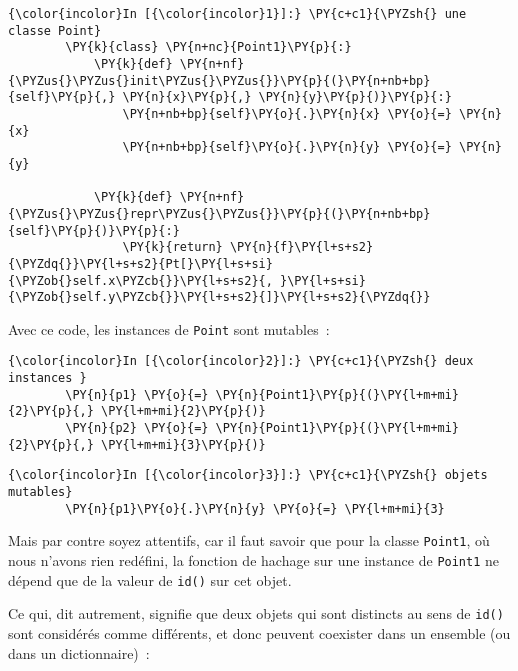    \begin{Verbatim}[commandchars=\\\{\},frame=single,framerule=0.3mm,rulecolor=\color{cellframecolor}]
{\color{incolor}In [{\color{incolor}1}]:} \PY{c+c1}{\PYZsh{} une classe Point}
        \PY{k}{class} \PY{n+nc}{Point1}\PY{p}{:}
            \PY{k}{def} \PY{n+nf}{\PYZus{}\PYZus{}init\PYZus{}\PYZus{}}\PY{p}{(}\PY{n+nb+bp}{self}\PY{p}{,} \PY{n}{x}\PY{p}{,} \PY{n}{y}\PY{p}{)}\PY{p}{:}
                \PY{n+nb+bp}{self}\PY{o}{.}\PY{n}{x} \PY{o}{=} \PY{n}{x}
                \PY{n+nb+bp}{self}\PY{o}{.}\PY{n}{y} \PY{o}{=} \PY{n}{y}
                
            \PY{k}{def} \PY{n+nf}{\PYZus{}\PYZus{}repr\PYZus{}\PYZus{}}\PY{p}{(}\PY{n+nb+bp}{self}\PY{p}{)}\PY{p}{:}
                \PY{k}{return} \PY{n}{f}\PY{l+s+s2}{\PYZdq{}}\PY{l+s+s2}{Pt[}\PY{l+s+si}{\PYZob{}self.x\PYZcb{}}\PY{l+s+s2}{, }\PY{l+s+si}{\PYZob{}self.y\PYZcb{}}\PY{l+s+s2}{]}\PY{l+s+s2}{\PYZdq{}}
\end{Verbatim}


    Avec ce code, les instances de \texttt{Point} sont mutables~:

    \begin{Verbatim}[commandchars=\\\{\},frame=single,framerule=0.3mm,rulecolor=\color{cellframecolor}]
{\color{incolor}In [{\color{incolor}2}]:} \PY{c+c1}{\PYZsh{} deux instances }
        \PY{n}{p1} \PY{o}{=} \PY{n}{Point1}\PY{p}{(}\PY{l+m+mi}{2}\PY{p}{,} \PY{l+m+mi}{2}\PY{p}{)}
        \PY{n}{p2} \PY{o}{=} \PY{n}{Point1}\PY{p}{(}\PY{l+m+mi}{2}\PY{p}{,} \PY{l+m+mi}{3}\PY{p}{)}
\end{Verbatim}


    \begin{Verbatim}[commandchars=\\\{\},frame=single,framerule=0.3mm,rulecolor=\color{cellframecolor}]
{\color{incolor}In [{\color{incolor}3}]:} \PY{c+c1}{\PYZsh{} objets mutables}
        \PY{n}{p1}\PY{o}{.}\PY{n}{y} \PY{o}{=} \PY{l+m+mi}{3}
\end{Verbatim}


    Mais par contre soyez attentifs, car il faut savoir que pour la classe
\texttt{Point1}, où nous n'avons rien redéfini, la fonction de hachage
sur une instance de \texttt{Point1} ne dépend que de la valeur de
\texttt{id()} sur cet objet.

Ce qui, dit autrement, signifie que deux objets qui sont distincts au
sens de \texttt{id()} sont considérés comme différents, et donc peuvent
coexister dans un ensemble (ou dans un dictionnaire)~:

